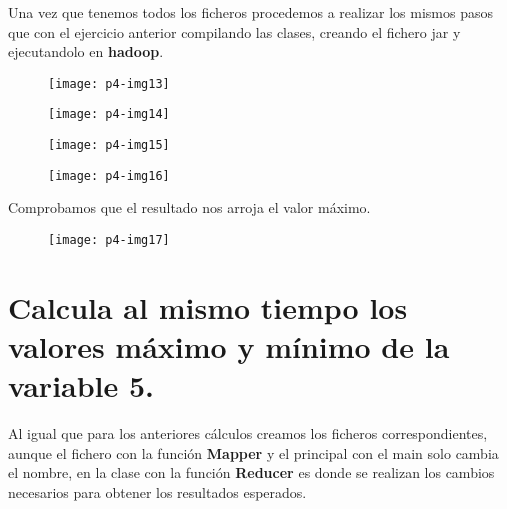 \documentclass[10pt]{article}
\begin{document}
Una vez que tenemos todos los ficheros procedemos a realizar los mismos pasos que con el ejercicio anterior compilando las clases, creando el fichero jar y ejecutandolo en \textbf{hadoop}. \\

\begin{figure}[H]
	\begin{center}
 		\texttt{[image: p4-img13]}
	\end{center} 
\end{figure}

\begin{figure}[H]
	\begin{center}
 		\texttt{[image: p4-img14]}
	\end{center} 
\end{figure}

\begin{figure}[H]
	\begin{center}
 		\texttt{[image: p4-img15]}
	\end{center} 
\end{figure}

\begin{figure}[H]
	\begin{center}
 		\texttt{[image: p4-img16]}
	\end{center} 
\end{figure}

Comprobamos que el resultado nos arroja el valor máximo. \\

\begin{figure}[H]
	\begin{center}
 		\texttt{[image: p4-img17]}
	\end{center} 
\end{figure}


\section{Calcula al mismo tiempo los valores máximo y mínimo de la variable 5.} 
Al igual que para los anteriores cálculos creamos los ficheros correspondientes, aunque el fichero con la función \textbf{Mapper} y el principal con el main solo cambia el nombre, en la clase con la función \textbf{Reducer} es donde se realizan los cambios necesarios para obtener los resultados esperados. \\
\end{document}
